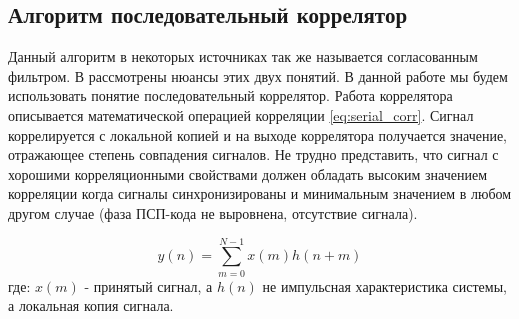 \subsection{Алгоритм последовательный коррелятор}
\label{sec1_serial}

Данный алгоритм в некоторых источниках так же называется согласованным фильтром. В \cite{sklyar} рассмотрены нюансы этих двух понятий.
В данной работе мы будем использовать понятие последовательный коррелятор. Работа коррелятора описывается математической операцией
корреляции \ref{eq:serial_corr}. Сигнал коррелируется с локальной копией и на выходе коррелятора получается значение, отражающее
степень совпадения сигналов. Не трудно представить, что сигнал с хорошими корреляционными свойствами должен обладать высоким значением
корреляции когда сигналы синхронизированы и минимальным значением в любом другом случае (фаза ПСП-кода не выровнена, отсутствие сигнала).

\begin{equation}
	\label{eq:serial_corr}
	y(n)=\sum\limits_{m=0}^{N-1}{x(m)h(n+m)}
\end{equation}
где: ${x(m)}$ - принятый сигнал, а ${h(n)}$ не импульсная характеристика системы, а локальная копия сигнала.

\newpage
